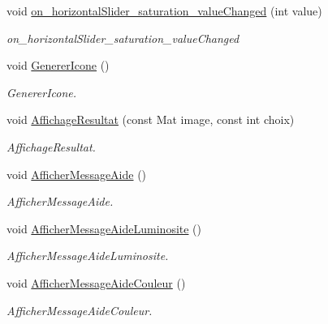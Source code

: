\begin{DoxyCompactItemize}
void \hyperlink{classAppMainWindow_ad787cd4562105ed369bcdcdc845281ba}{on\+\_\+horizontal\+Slider\+\_\+saturation\+\_\+value\+Changed} (int value)
\begin{DoxyCompactList}\small\item\em on\+\_\+horizontal\+Slider\+\_\+saturation\+\_\+value\+Changed \end{DoxyCompactList}\item 
\mbox{\label{classAppMainWindow_af0e866de3613767003476b1561610e82}} 
void \hyperlink{classAppMainWindow_af0e866de3613767003476b1561610e82}{Generer\+Icone} ()
\begin{DoxyCompactList}\small\item\em Generer\+Icone. \end{DoxyCompactList}\item 
void \hyperlink{classAppMainWindow_ad781a57c27766f8535efa0f66decb03d}{Affichage\+Resultat} (const Mat image, const int choix)
\begin{DoxyCompactList}\small\item\em Affichage\+Resultat. \end{DoxyCompactList}\item 
\mbox{\label{classAppMainWindow_a1d2e1ff9d275e8c2f24d68d9629fb057}} 
void \hyperlink{classAppMainWindow_a1d2e1ff9d275e8c2f24d68d9629fb057}{Afficher\+Message\+Aide} ()
\begin{DoxyCompactList}\small\item\em Afficher\+Message\+Aide. \end{DoxyCompactList}\item 
\mbox{\label{classAppMainWindow_a60a98999477e2832eed0aa60786baacc}} 
void \hyperlink{classAppMainWindow_a60a98999477e2832eed0aa60786baacc}{Afficher\+Message\+Aide\+Luminosite} ()
\begin{DoxyCompactList}\small\item\em Afficher\+Message\+Aide\+Luminosite. \end{DoxyCompactList}\item 
\mbox{\label{classAppMainWindow_a49fb213f39d1210bb3b6a29b755422a1}} 
void \hyperlink{classAppMainWindow_a49fb213f39d1210bb3b6a29b755422a1}{Afficher\+Message\+Aide\+Couleur} ()
\begin{DoxyCompactList}\small\item\em Afficher\+Message\+Aide\+Couleur. \end{DoxyCompactList}\item 

\end{DoxyCompactItemize}
